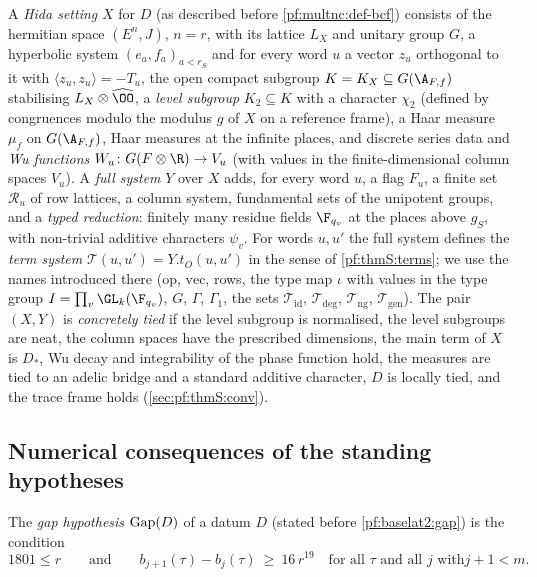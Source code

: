 A \emph{Hida setting} $X$ for $D$ (as described before \cref{pf:multnc:def-bcf}) consists of the hermitian space $(E^n,J)$, $n=r$, with
its lattice $L_X$ and unitary group $G$, a hyperbolic system $(e_a,f_a)_{a<r_S}$ and for every word $u$ a vector $z_u$
orthogonal to it with $\langle z_u,z_u\rangle=-T_u$, the open compact subgroup $K=K_X\subseteq G(\A_{F,f})$ stabilising
$L_X\otimes\widehat\OO$, a \emph{level subgroup} $K_2\subseteq K$ with a character $\chi_2$ (defined by congruences
modulo the modulus $g$ of $X$ on a reference frame), a Haar measure $\mu_f$ on $G(\A_{F,f})$, Haar measures at the infinite places, and
discrete series data and \emph{Wu functions} $W_u\colon G(F\otimes\R)\to V_u$ (with values in the finite-dimensional
column spaces $V_u$). A \emph{full system} $Y$ over $X$ adds, for every word $u$, a flag $F_u$, a finite set $\mathcal
R_u$ of row lattices, a column system, fundamental sets of the unipotent groups, and a \emph{typed reduction}: finitely
many residue fields $\F_{q_v}$ at the places above $g_S$, with non-trivial additive characters $\psi_v$. For words
$u,u'$ the full system defines the \emph{term system} $\mathcal T(u,u')=Y.t_O(u,u')$ in the sense of
\cref{pf:thmS:terms}; we use the names introduced there ($\mathrm{op}$, $\mathrm{vec}$, rows, the type map $\iota$
with values in the type group $I=\prod_v\GL_k(\F_{q_v})$, $G$, $\Gamma$, $\Gamma_1$, the sets $\mathcal T_{\mathrm{id}}$,
$\mathcal T_{\mathrm{deg}}$, $\mathcal T_{\mathrm{ng}}$, $\mathcal T_{\mathrm{gen}}$). The pair $(X,Y)$ is
\emph{concretely tied} if the level subgroup is normalised, the level subgroups are neat, the column spaces have the
prescribed dimensions, the main term of $X$ is $D_*$, Wu decay and integrability of the phase function hold, the
measures are tied to an adelic bridge and a standard additive character, $D$ is locally tied, and the trace frame
holds (\cref{sec:pf:thmS:conv}).

\subsection{Numerical consequences of the standing hypotheses}\label{sec:pf:sh-siegel:gap}

\begin{definition}\label{pf:sh-siegel:gapdef}
The \emph{gap hypothesis} $\mathrm{Gap}(D)$ of a datum $D$ (stated before \cref{pf:baselat2:gap}) is the condition
\begin{equation}\label{pf:sh-siegel:eq:gap}
1801\le r\qquad\text{and}\qquad b_{j+1}(\tau)-b_j(\tau)\ \ge\ 16\,r^{19}\quad\text{for all $\tau$ and all $j$ with
$j+1<m$.}
\end{equation}
\end{definition}

